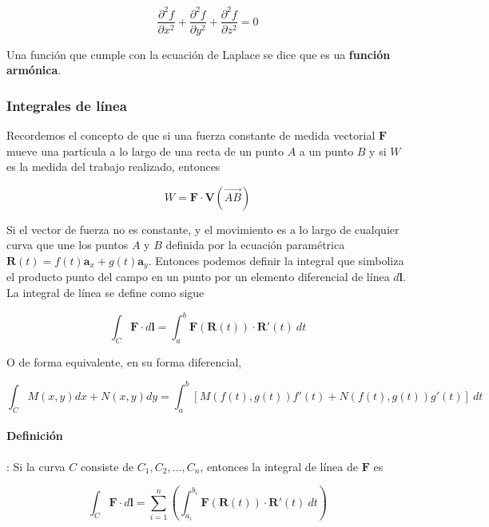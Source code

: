 \begin{equation*}
\frac{ \partial^2 f }{ \partial x^2 } + \frac{ \partial^2 f }{ \partial y^2 } + \frac{ \partial^2 f }{ \partial z^2 } = 0
\end{equation*}

Una función que cumple con la ecuación de Laplace se dice que es ua \textbf{función armónica}. 

\subsubsection{Integrales de línea}

Recordemos el concepto de que si una fuerza constante de medida vectorial $\mathbf{F}$ mueve una partícula a lo largo de una recta de un punto $A$ a un punto $B$ y si $W$ es la medida del trabajo realizado, entonces

\begin{equation*}
W = \mathbf{F} \cdot \mathbf{V}(\vec{AB})
\end{equation*}

Si el vector de fuerza no es constante, y el movimiento es a lo largo de cualquier curva que une los puntos $A$ y $B$ definida por la ecuación paramétrica $\mathbf{R}(t) = f(t) \mathbf{a}_x + g(t) \mathbf{a}_y$. Entonces podemos definir la integral que simboliza el producto punto del campo en un punto por un elemento diferencial de línea $d \mathbf{l}$. La integral de línea se define como sigue

\begin{equation*}
\int_C \mathbf{F} \cdot d \mathbf{l} = \int_a^b \mathbf{F}(\mathbf{R}(t)) \cdot \mathbf{R'}(t) \ dt
\end{equation*}

O de forma equivalente, en su forma diferencial,

\begin{equation*}
\int_C M(x,y) dx + N(x,y) dy = \int_a^b \left[ M(f(t),g(t)) f'(t) + N(f(t),g(t)) g'(t) \right] \ dt 
\end{equation*}

\paragraph*{Definición}: Si la curva $C$ consiste de $C_1, C_2, \dots, C_n$, entonces la integral de línea de $\mathbf{F}$ es

\begin{equation*}
\int_C \mathbf{F} \cdot d \mathbf{l} = \sum_{i=1}^{n} \left( \int_{a_i}^{b_i} \mathbf{F}(\mathbf{R}(t)) \cdot \mathbf{R}'(t) \ d t \right)
\end{equation*}

